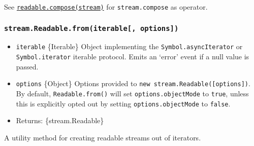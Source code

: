 See
\hyperref[readablecomposestream-options]{\texttt{readable.compose(stream)}}
for \texttt{stream.compose} as operator.

\subsubsection{\texorpdfstring{\texttt{stream.Readable.from(iterable{[},\ options{]})}}{stream.Readable.from(iterable{[}, options{]})}}\label{stream.readable.fromiterable-options}

\begin{itemize}
\tightlist
\item
  \texttt{iterable} \{Iterable\} Object implementing the
  \texttt{Symbol.asyncIterator} or \texttt{Symbol.iterator} iterable
  protocol. Emits an `error' event if a null value is passed.
\item
  \texttt{options} \{Object\} Options provided to
  \texttt{new\ stream.Readable({[}options{]})}. By default,
  \texttt{Readable.from()} will set \texttt{options.objectMode} to
  \texttt{true}, unless this is explicitly opted out by setting
  \texttt{options.objectMode} to \texttt{false}.
\item
  Returns: \{stream.Readable\}
\end{itemize}

A utility method for creating readable streams out of iterators.

\begin{Shaded}
\begin{Highlighting}[]
\OperatorTok{=} \NormalTok{(}\NormalTok{)}\OperatorTok{;}

  \OperatorTok{*} \NormalTok{() \{}
   \OperatorTok{;}
   \OperatorTok{;}
\NormalTok{\}}

\OperatorTok{=}\NormalTok{(}\NormalTok{())}\OperatorTok{;}

\NormalTok{(}\OperatorTok{,}\KeywordTok{=\textgreater{}}\NormalTok{ \{}
  \OperatorTok{;}
\NormalTok{\})}\OperatorTok{;}
\end{Highlighting}
\end{Shaded}

